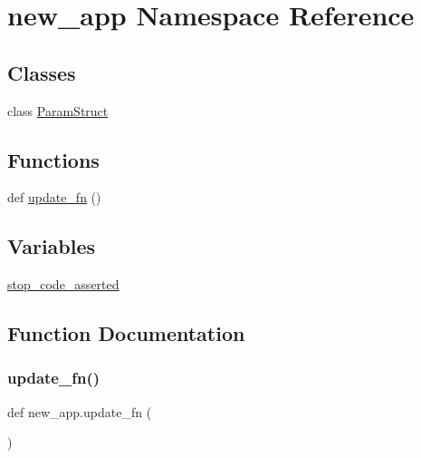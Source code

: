 \hypertarget{namespacenew__app}{}\section{new\+\_\+app Namespace Reference}
\label{namespacenew__app}
\subsection*{Classes}
\begin{DoxyCompactItemize}
\item 
class \hyperlink{classnew__app_1_1ParamStruct}{Param\+Struct}
\end{DoxyCompactItemize}
\subsection*{Functions}
\begin{DoxyCompactItemize}
\item 
def \hyperlink{namespacenew__app_a3861515cd807c9fe679ffb2c2ac7e208}{update\+\_\+fn} ()
\end{DoxyCompactItemize}
\subsection*{Variables}
\begin{DoxyCompactItemize}
\item 
\hyperlink{namespacenew__app_a18f2d0f3bfc48f8054be097380e3e91f}{stop\+\_\+code\+\_\+asserted}
\end{DoxyCompactItemize}


\subsection{Function Documentation}
\mbox{\label{namespacenew__app_a3861515cd807c9fe679ffb2c2ac7e208}} 
\subsubsection{\texorpdfstring{update\+\_\+fn()}{update\_fn()}}
{\footnotesize\ttfamily def new\+\_\+app.\+update\+\_\+fn (\begin{DoxyParamCaption}{ }\end{DoxyParamCaption})}



